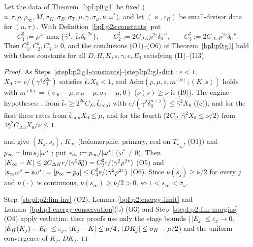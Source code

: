 \begin{theorem}\label{bpI:p2s:g1}
Let the data of Theorem~\ref{bpI:p0:g1} be fixed ($n,\tau,\rho,\rho_\infty,M,\sigma_K,\sigma_B,\sigma_T,\mu,\bar\gamma,\sigma_\omega,\nu,\omega^*$), and let
$(\varkappa,c_R)$ be small-divisor data for $(n,\tau)$. With Definition~\ref{bpI:p2s:constants} put
\[
C_1^\sharp:=\rho^{4\tau}\max\{\bar\gamma^4,\ \hat{\mathfrak c}_*\delta_0^{-2a}\},\qquad C_2^\sharp:=2C_{\Delta K}\rho^{2\tau}\delta_0^{-a},\qquad
C_3^\sharp:=2C_{\Delta\omega}\rho^{2\tau}\delta_0^{-a}.
\]
Then $C_1^\sharp,C_2^\sharp,C_3^\sharp>0$, and the conclusions (O1)--(O6) of Theorem~\ref{bpI:p0:g1} hold with these constants for all
$D,H,K,s,\gamma,e,E_0$ satisfying (I1)--(I13).
\end{theorem}

\begin{proof}
\label{stepI:p2s:g1-eng}
As Steps~\ref{stepI:p2:g1-constants}--\ref{stepI:p2:g1-dict}: $e<1$, $X_0:=e/(\gamma^4\delta_0^{2a})$ satisfies $\hat{\mathfrak c}_*X_0<1$, and
$\mathrm{Adm}(\rho,\mu,e,m^{(0)};(K,s))$ holds with $m^{(0)}=(\sigma_K-\mu,\sigma_B-\mu,\sigma_T-\mu,0)$ ($\nu(s)\ge\nu$ is (I9)). The engine hypotheses:
,  from $\hat{\mathfrak c}_*\ge2^{2a}C_E,\hat{\mathfrak c}_{\mathrm{step}}$; with $e/(\gamma^2\delta_0^{a+j})\le\bar\gamma^2X_0$
((c)),  and  for the first three rates from $\hat{\mathfrak c}_{\mathrm{sum}}X_0\le\mu$, and
 for the fourth ($2C_{\Delta\omega}\bar\gamma^2X_0\le\nu/2$) from $4\bar\gamma^2C_{\Delta\omega}X_0/\nu\le1$.

\label{stepI:p2s:g1-lim}
 and  give $(K_j,s_j)$, $K_\infty$ (holomorphic, primary, real on $T_{\rho_\infty}$, (O1)) and
$p_\infty=\lim s_j\lvert \omega^*\rvert$; put $s_\infty:=p_\infty/\lvert \omega^*\rvert$ ($\omega^*\ne0$). Then $\lvert K_\infty-K\rvert\le2C_{\Delta K}e/(\gamma^2\delta_0^a)=C_2^\sharp
e/(\gamma^2\rho^{2\tau})$ (O5) and $\lvert s_\infty\omega^*-s\omega^*\rvert=\lvert p_\infty-p_0\rvert\le C_3^\sharp e/(\gamma^2\rho^{2\tau})$ (O6). Since $\nu(s_j)\ge\nu/2$ for every
$j$ and $\nu(\cdot)$ is continuous, $\nu(s_\infty)\ge\nu/2>0$, so $1<s_\infty<\sigma_\omega$.

\label{stepI:p2s:g1-o}
Step~\ref{stepI:p2:lim-inv} (O2), Lemma~\ref{bpI:p2:energy-limit} and Lemma~\ref{bpI:p1:energy-conservation}(b) (O3) and
Step~\ref{stepI:p2:lim-margins} (O4) apply verbatim: their proofs use only the stage bounds ($\lvert E_j\rvert\le\varepsilon_j\to0$, $\lvert \bar E_H(K_j)-E_0\rvert\le
\varepsilon_j$, $\lvert K_j-K\rvert\le\mu/4$, $\lvert DK_j\rvert\le\sigma_K-\mu/2$) and the uniform convergence of $K_j$, $DK_j$.
\end{proof}


